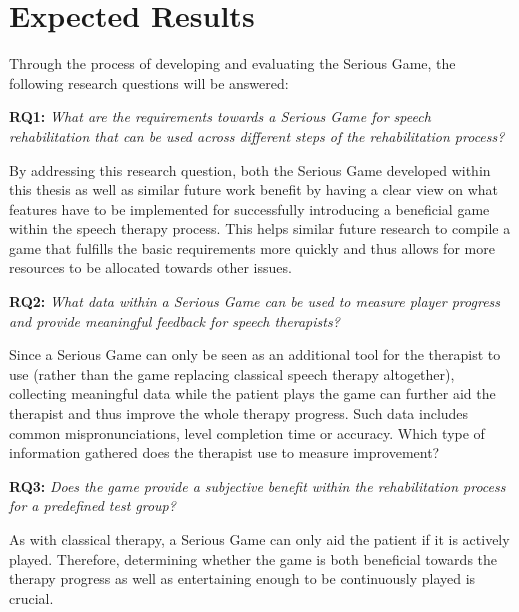 \documentclass[draft,final]{vutinfth} %
\begin{document}
\section{Expected Results}
Through the process of developing and evaluating the Serious Game, the following research questions will be answered:

\begin{center}
\textbf{RQ1:} \textit{What are the requirements towards a Serious Game for speech rehabilitation that can be used across different steps of the rehabilitation process?}
\end{center} 

By addressing this research question, both the Serious Game developed within this thesis as well as similar future work benefit by having a clear view on what features have to be implemented for successfully introducing a beneficial game within the speech therapy process. This helps similar future research to compile a game that fulfills the basic requirements more quickly and thus allows for more resources to be allocated towards other issues.

\begin{center}
\textbf{RQ2:} \textit{What data within a Serious Game can be used to measure player progress and provide meaningful feedback for speech therapists?}
\end{center}

Since a Serious Game can only be seen as an additional tool for the therapist to use (rather than the game replacing classical speech therapy altogether), collecting meaningful data while the patient plays the game can further aid the therapist and thus improve the whole therapy progress. Such data includes common mispronunciations, level completion time or accuracy. Which type of information gathered does the therapist use to measure improvement?

\begin{center}
\textbf{RQ3:} \textit{Does the game provide a subjective benefit within the rehabilitation process for a predefined test group?}
\end{center}

As with classical therapy, a Serious Game can only aid the patient if it is actively played. Therefore, determining whether the game is both beneficial towards the therapy progress as well as entertaining enough to be continuously played is crucial. \\
\end{document}
